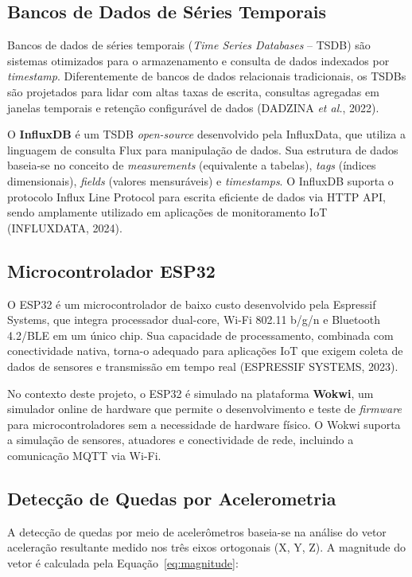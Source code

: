 \documentclass[a4paper,12pt]{article}
\begin{document}
\subsection{Bancos de Dados de Séries Temporais}

Bancos de dados de séries temporais (\textit{Time Series Databases} -- TSDB) são sistemas otimizados para o armazenamento e consulta de dados indexados por \textit{timestamp}. Diferentemente de bancos de dados relacionais tradicionais, os TSDBs são projetados para lidar com altas taxas de escrita, consultas agregadas em janelas temporais e retenção configurável de dados (DADZINA \textit{et al.}, 2022).

O \textbf{InfluxDB} é um TSDB \textit{open-source} desenvolvido pela InfluxData, que utiliza a linguagem de consulta Flux para manipulação de dados. Sua estrutura de dados baseia-se no conceito de \textit{measurements} (equivalente a tabelas), \textit{tags} (índices dimensionais), \textit{fields} (valores mensuráveis) e \textit{timestamps}. O InfluxDB suporta o protocolo Influx Line Protocol para escrita eficiente de dados via HTTP API, sendo amplamente utilizado em aplicações de monitoramento IoT (INFLUXDATA, 2024).

\subsection{Microcontrolador ESP32}

O ESP32 é um microcontrolador de baixo custo desenvolvido pela Espressif Systems, que integra processador dual-core, Wi-Fi 802.11 b/g/n e Bluetooth 4.2/BLE em um único chip. Sua capacidade de processamento, combinada com conectividade nativa, torna-o adequado para aplicações IoT que exigem coleta de dados de sensores e transmissão em tempo real (ESPRESSIF SYSTEMS, 2023).

No contexto deste projeto, o ESP32 é simulado na plataforma \textbf{Wokwi}, um simulador online de hardware que permite o desenvolvimento e teste de \textit{firmware} para microcontroladores sem a necessidade de hardware físico. O Wokwi suporta a simulação de sensores, atuadores e conectividade de rede, incluindo a comunicação MQTT via Wi-Fi.

\subsection{Detecção de Quedas por Acelerometria}

A detecção de quedas por meio de acelerômetros baseia-se na análise do vetor aceleração resultante medido nos três eixos ortogonais (X, Y, Z). A magnitude do vetor é calculada pela Equação~\ref{eq:magnitude}:
\end{document}
